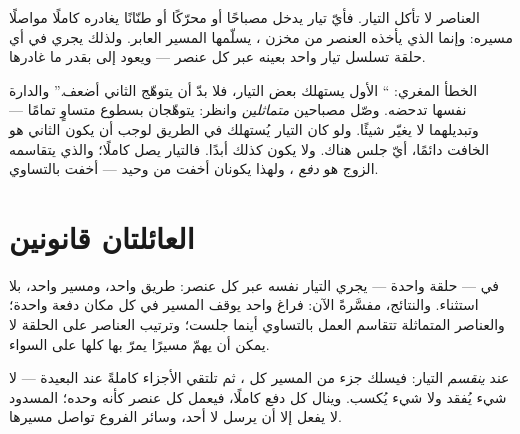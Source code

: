 \begin{proposition}\label{prop:g7:circuits-series-parallel:notconsumed}
العناصر لا تأكل التيار. فأيّ تيار يدخل مصباحًا أو محرّكًا أو
طنّانًا يغادره كاملًا مواصلًا مسيره: وإنما الذي يأخذه العنصر
\emph{} من مخزن ، يسلّمها المسير العابر. ولذلك يجري
في أي حلقة تسلسل تيار واحد بعينه عبر كل عنصر --- ويعود إلى
 بقدر ما غادرها.
\end{proposition}

\begin{example}\label{ex:g7:circuits-series-parallel:trial}
الخطأ المغري: `` الأول يستهلك بعض التيار، فلا بدّ أن
يتوهّج الثاني أضعف.'' والدارة نفسها تدحضه. وصّل مصباحين
\emph{متماثلين}  وانظر: يتوهّجان بسطوع متساوٍ تمامًا
--- وتبديلهما لا يغيّر شيئًا. ولو كان التيار يُستهلك في
الطريق لوجب أن يكون  الثاني هو الخافت دائمًا، أيّ 
جلس هناك. ولا يكون كذلك أبدًا. فالتيار يصل كاملًا؛ والذي
يتقاسمه الزوج هو \emph{دفع} ، ولهذا يكونان أخفت من
 وحيد --- أخفت بالتساوي.
\end{example}

\section{العائلتان قانونين}

\begin{proposition}\label{prop:g7:circuits-series-parallel:series}
في  --- حلقة واحدة --- يجري التيار نفسه عبر كل
عنصر: طريق واحد، ومسير واحد، بلا استثناء. والنتائج، مفسَّرةً
الآن: فراغ واحد يوقف المسير في كل مكان دفعة واحدة؛ والعناصر
المتماثلة تتقاسم العمل بالتساوي أينما جلست؛ وترتيب العناصر على
الحلقة لا يمكن أن يهمّ مسيرًا يمرّ بها كلها على السواء.
\end{proposition}

\begin{proposition}\label{prop:g7:circuits-series-parallel:parallel}
عند  \emph{ينقسم} التيار: فيسلك جزء من المسير كل ، ثم
تلتقي الأجزاء كاملةً عند  البعيدة --- لا شيء يُفقد ولا
شيء يُكسب. وينال كل  دفع  كاملًا، فيعمل كل عنصر كأنه
وحده؛  المسدود لا يفعل إلا أن يرسل لا أحد، وسائر الفروع
تواصل مسيرها.
\end{proposition}


